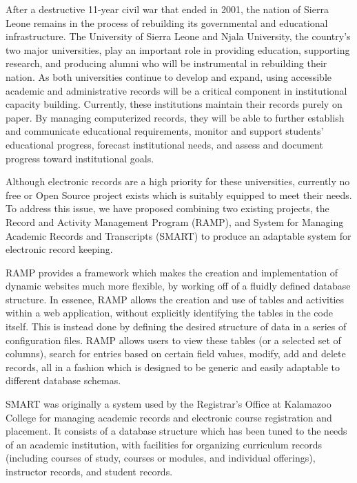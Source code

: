 \documentclass[12pt]{article}
\begin{document}
After a destructive 11-year civil war that ended in 2001, the nation of Sierra Leone remains in the process of rebuilding its governmental and educational infrastructure. The University of Sierra Leone and Njala University, the country's two major universities, play an important role in providing education, supporting research, and producing alumni who will be instrumental in rebuilding their nation. As both universities continue to develop and expand, using accessible academic and administrative records will be a critical component in institutional capacity building. Currently, these institutions maintain their records purely on paper. By managing computerized records, they will be able to further establish and communicate educational requirements, monitor and support students' educational progress, forecast institutional needs, and assess and document progress toward institutional goals.

Although electronic records are a high priority for these universities, currently no free or Open Source project exists which is suitably equipped to meet their needs. To address this issue, we have proposed combining two existing projects, the Record and Activity Management Program (RAMP), and System for Managing Academic Records and Transcripts (SMART) to produce an adaptable system for electronic record keeping.

RAMP provides a framework which makes the creation and implementation of dynamic websites much more flexible, by working off of a fluidly defined database structure. In essence, RAMP allows the creation and use of tables and activities within a web application, without explicitly identifying the tables in the code itself. This is instead done by defining the desired structure of data in a series of configuration files. RAMP allows users to view these tables (or a selected set of columns), search for entries based on certain field values, modify, add and delete records, all in a fashion which is designed to be generic and easily adaptable to different database schemas.

SMART was originally a system used by the Registrar's Office at Kalamazoo College for managing academic records and electronic course registration and placement. It consists of a database structure which has been tuned to the needs of an academic institution, with facilities for organizing curriculum records (including courses of study, courses or modules, and individual offerings), instructor records, and student records.
\end{document}
